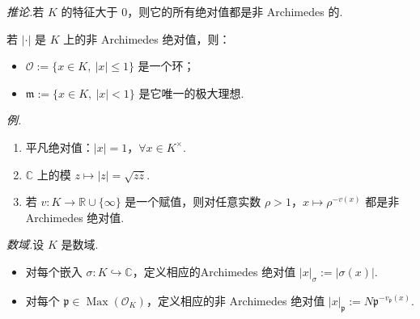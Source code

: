 \emph{推论.}若 $K$ 的特征大于 $0$，则它的所有绝对值都是非 Archimedes 的.
\begin{remark*}
若 $|\cdot|$ 是 $K$ 上的非 Archimedes 绝对值，则：
\begin{itemize}
\item $\mathcal O:=\{x\in K,\ |x|\le1\}$ 是一个环；
\item $\mathfrak m:=\{x\in K,\ |x|<1\}$ 是它唯一的极大理想.
\end{itemize}
\end{remark*}
\emph{例.}
\begin{enumerate}[label=\roman*)]
\item 平凡绝对值：$|x|=1$，$\forall x\in K^\times$.
\item $\mathbb C$ 上的模 $z\mapsto |z|=\sqrt{z\overline z}$.
\item 若 $v\colon K\longrightarrow\mathbb R\cup\{\infty\}$ 是一个赋值，则对任意实数 $\rho>1$，$x\mapsto\rho^{-v(x)}$ 都是非 Archimedes 绝对值.
\end{enumerate}
\emph{数域.}设 $K$ 是数域.
\begin{itemize}
\item 对每个嵌入 $\sigma\colon K\hookrightarrow\mathbb C$，定义相应的Archimedes 绝对值 $|x|_\sigma:=|\sigma(x)|$.
\item 对每个 $\mathfrak p\in\operatorname{Max}(\mathcal O_K)$，定义相应的非 Archimedes 绝对值 $|x|_{\mathfrak p}:=N\mathfrak p^{-v_{\mathfrak p}(x)}$.
\end{itemize}

